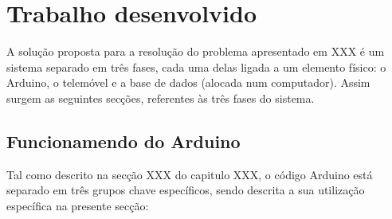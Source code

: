 \chapter{Trabalho desenvolvido}
\label{cha:trabalho desenvolvido}

A solução proposta para a resolução do problema apresentado em XXX é um sistema separado em três fases, cada uma delas ligada a um elemento físico: o Arduino, o telemóvel e a base de dados (alocada num computador). Assim surgem as seguintes secções, referentes às três fases do sistema.

\section{Funcionamendo do Arduino}
\label{sec:funcionamento_do_arduino}
Tal como descrito na secção XXX do capitulo XXX, o código Arduino está separado em três grupos chave específicos, sendo descrita a sua utilização específica na presente secção:

